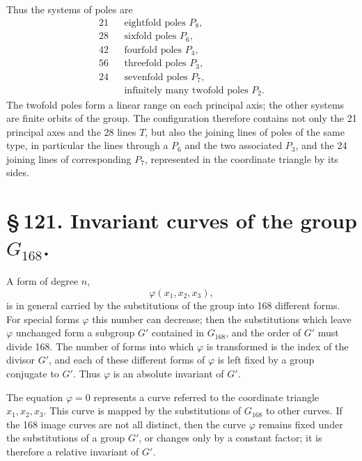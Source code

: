 \documentclass[11pt]{article}
\begin{document}
Thus the systems of poles are
\begin{equation}
\begin{array}{rcl}
21&&\text{eightfold poles }P_8,\\
28&&\text{sixfold poles }P_6,\\
42&&\text{fourfold poles }P_4,\\
56&&\text{threefold poles }P_3,\\
24&&\text{sevenfold poles }P_7,\\
&&\text{infinitely many twofold poles }P_2.
\end{array}
\tag{2}
\end{equation}
The twofold poles form a linear range on each principal axis; the other systems are finite orbits of the group. The configuration therefore contains not only the 21 principal axes and the 28 lines \(T\), but also the joining lines of poles of the same type, in particular the lines through a \(P_6\) and the two associated \(P_3\), and the 24 joining lines of corresponding \(P_7\), represented in the coordinate triangle by its sides.



\section*{\S\,121. Invariant curves of the group \(G_{168}\).}

A form of degree \(n\),
\begin{equation}
\varphi(x_1,x_2,x_3),
\end{equation}
is in general carried by the substitutions of the group into 168 different forms. For special forms \(\varphi\) this number can decrease; then the substitutions which leave \(\varphi\) unchanged form a subgroup \(G'\) contained in \(G_{168}\), and the order of \(G'\) must divide 168. The number of forms into which \(\varphi\) is transformed is the index of the divisor \(G'\), and each of these different forms of \(\varphi\) is left fixed by a group conjugate to \(G'\). Thus \(\varphi\) is an absolute invariant of \(G'\).

The equation \(\varphi=0\) represents a curve referred to the coordinate triangle \(x_1,x_2,x_3\). This curve is mapped by the substitutions of \(G_{168}\) to other curves. If the 168 image curves are not all distinct, then the curve \(\varphi\) remains fixed under the substitutions of a group \(G'\), or changes only by a constant factor; it is therefore a relative invariant of \(G'\).
\end{document}
